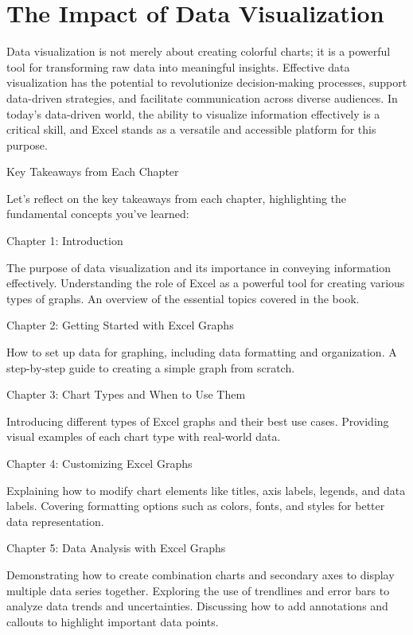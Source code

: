 \documentclass[
]{book}
\begin{document}
\hypertarget{the-impact-of-data-visualization}{%
\section{The Impact of Data Visualization}\label{the-impact-of-data-visualization}}

Data visualization is not merely about creating colorful charts; it is a powerful tool for transforming raw data into meaningful insights. Effective data visualization has the potential to revolutionize decision-making processes, support data-driven strategies, and facilitate communication across diverse audiences. In today's data-driven world, the ability to visualize information effectively is a critical skill, and Excel stands as a versatile and accessible platform for this purpose.

Key Takeaways from Each Chapter

Let's reflect on the key takeaways from each chapter, highlighting the fundamental concepts you've learned:

Chapter 1: Introduction

The purpose of data visualization and its importance in conveying information effectively.
Understanding the role of Excel as a powerful tool for creating various types of graphs.
An overview of the essential topics covered in the book.

Chapter 2: Getting Started with Excel Graphs

How to set up data for graphing, including data formatting and organization.
A step-by-step guide to creating a simple graph from scratch.

Chapter 3: Chart Types and When to Use Them

Introducing different types of Excel graphs and their best use cases.
Providing visual examples of each chart type with real-world data.

Chapter 4: Customizing Excel Graphs

Explaining how to modify chart elements like titles, axis labels, legends, and data labels.
Covering formatting options such as colors, fonts, and styles for better data representation.

Chapter 5: Data Analysis with Excel Graphs

Demonstrating how to create combination charts and secondary axes to display multiple data series together.
Exploring the use of trendlines and error bars to analyze data trends and uncertainties.
Discussing how to add annotations and callouts to highlight important data points.
\end{document}
